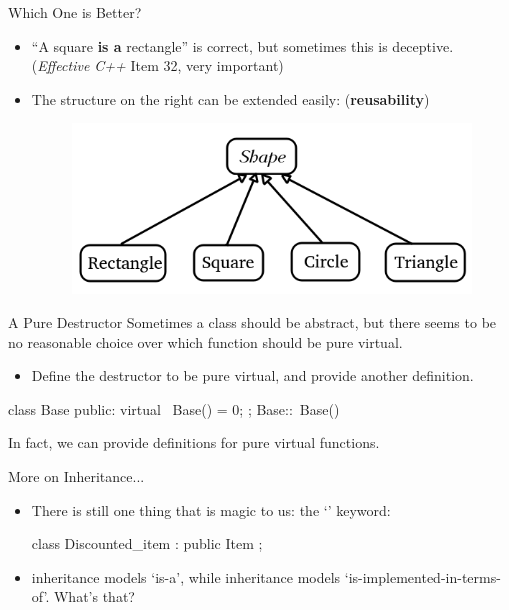 \documentclass{beamer}
\begin{document}
\begin{frame}{Which One is Better?}
    \begin{itemize}
        \item ``A square \textbf{is a} rectangle'' is correct, but sometimes this is deceptive. (\textit{Effective C++} Item 32, very important)
        \item The structure on the right can be extended easily: (\textbf{reusability})
        \begin{figure}[h]
            \centering
            \includegraphics[scale=0.6]{figures/shape_extended.png}
        \end{figure}
    \end{itemize}
\end{frame}

\begin{frame}[fragile]{A Pure \virtual Destructor}
    Sometimes a class should be abstract, but there seems to be no reasonable choice over which function should be pure virtual.
    \pause
    \begin{itemize}
        \item Define the destructor to be pure virtual, and provide another definition.
    \end{itemize}
    \begin{cpp}
class Base {
 public:
  virtual ~Base() = 0;
};
Base::~Base() {}
    \end{cpp}
    In fact, we can provide definitions for pure virtual functions.
\end{frame}

\begin{frame}[fragile]{More on Inheritance...}
    \begin{itemize}
        \item There is still one thing that is magic to us: the `' keyword:
        \begin{cpp}
class Discounted_item : public Item {};
        \end{cpp}
        \item \public inheritance models `is-a', while \private inheritance models `is-implemented-in-terms-of'. What's that?
    \end{itemize}
\end{frame}
\end{document}
